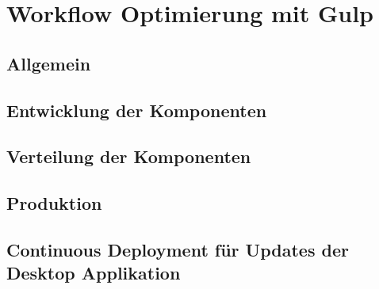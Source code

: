 
\chapter{Workflow Optimierung mit Gulp}


\section{Allgemein}
\section{Entwicklung der Komponenten}
\section{Verteilung der Komponenten}
\section{Produktion}
\section{Continuous Deployment für Updates der Desktop Applikation}
